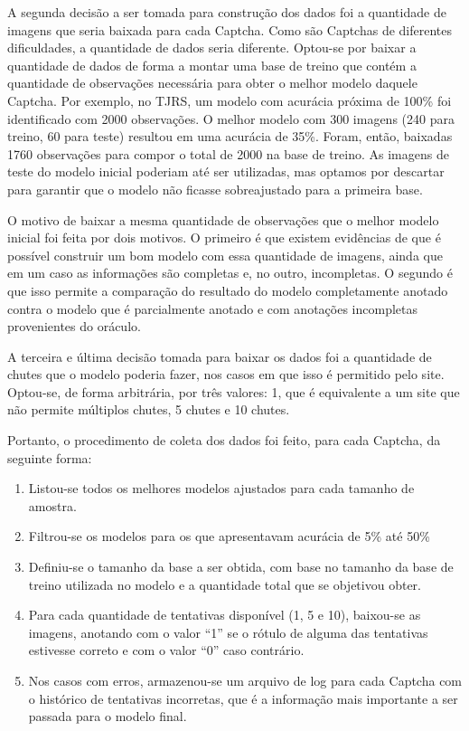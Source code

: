\documentclass[12pt,twoside,brazilian]{book}
\providecommand{\tightlist}{%
  \setlength{\itemsep}{0pt}\setlength{\parskip}{0pt}}
\begin{document}
A segunda decisão a ser tomada para construção dos dados foi a
quantidade de imagens que seria baixada para cada Captcha. Como são
Captchas de diferentes dificuldades, a quantidade de dados seria
diferente. Optou-se por baixar a quantidade de dados de forma a montar
uma base de treino que contém a quantidade de observações necessária
para obter o melhor modelo daquele Captcha. Por exemplo, no TJRS, um
modelo com acurácia próxima de 100\% foi identificado com 2000
observações. O melhor modelo com 300 imagens (240 para treino, 60 para
teste) resultou em uma acurácia de 35\%. Foram, então, baixadas 1760
observações para compor o total de 2000 na base de treino. As imagens de
teste do modelo inicial poderiam até ser utilizadas, mas optamos por
descartar para garantir que o modelo não ficasse sobreajustado para a
primeira base.

O motivo de baixar a mesma quantidade de observações que o melhor modelo
inicial foi feita por dois motivos. O primeiro é que existem evidências
de que é possível construir um bom modelo com essa quantidade de
imagens, ainda que em um caso as informações são completas e, no outro,
incompletas. O segundo é que isso permite a comparação do resultado do
modelo completamente anotado contra o modelo que é parcialmente anotado
e com anotações incompletas provenientes do oráculo.

A terceira e última decisão tomada para baixar os dados foi a quantidade
de chutes que o modelo poderia fazer, nos casos em que isso é permitido
pelo site. Optou-se, de forma arbitrária, por três valores: 1, que é
equivalente a um site que não permite múltiplos chutes, 5 chutes e 10
chutes.

Portanto, o procedimento de coleta dos dados foi feito, para cada
Captcha, da seguinte forma:

\begin{enumerate}
\def\labelenumi{\arabic{enumi}.}
\tightlist
\item
  Listou-se todos os melhores modelos ajustados para cada tamanho de
  amostra.
\item
  Filtrou-se os modelos para os que apresentavam acurácia de 5\% até
  50\%
\item
  Definiu-se o tamanho da base a ser obtida, com base no tamanho da base
  de treino utilizada no modelo e a quantidade total que se objetivou
  obter.
\item
  Para cada quantidade de tentativas disponível (1, 5 e 10), baixou-se
  as imagens, anotando com o valor ``1'' se o rótulo de alguma das
  tentativas estivesse correto e com o valor ``0'' caso contrário.
\item
  Nos casos com erros, armazenou-se um arquivo de log para cada Captcha
  com o histórico de tentativas incorretas, que é a informação mais
  importante a ser passada para o modelo final.
\end{enumerate}
\end{document}
